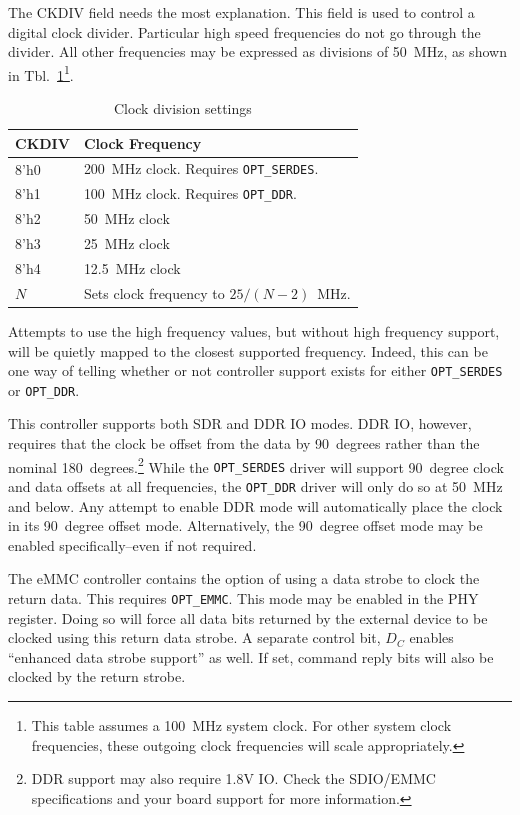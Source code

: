 \documentclass{gqtekspec}
\begin{document}
The CKDIV field needs the most explanation.  This field is used to control
a digital clock divider.  Particular high speed frequencies do not go through
the divider.  All other frequencies may be expressed as divisions of 50~MHz,
as shown in Tbl.~\ref{tbl:CKDIV}\footnote{This table assumes a 100~MHz
system clock.  For other system clock frequencies, these outgoing clock
frequencies will scale appropriately.}.
\begin{table}\begin{center}
\begin{tabular}{|p{1.2in}|p{4.0in}|}\hline
	\rowcolor[gray]{0.85} CKDIV & Clock Frequency\\\hline\hline
8'h0 & 200~MHz clock.  Requires {\tt OPT\_SERDES}.\\
8'h1 & 100~MHz clock.  Requires {\tt OPT\_DDR}.\\
8'h2 &  50~MHz clock\\
8'h3 &  25~MHz clock\\
8'h4 &  12.5~MHz clock\\
$N$ & Sets clock frequency to $25 / \left(N-2\right)$~MHz.
	\\\hline
\end{tabular}
\caption{Clock division settings}\label{tbl:CKDIV}
\end{center}\end{table}
Attempts to use the high frequency values, but without high frequency
support, will be quietly mapped to the closest supported frequency.  Indeed,
this can be one way of telling whether or not controller support exists for
either {\tt OPT\_SERDES} or {\tt OPT\_DDR}.

This controller supports both SDR and DDR IO modes.  DDR IO, however, requires
that the clock be offset from the data by 90~degrees rather than the nominal
180~degrees.\footnote{DDR support may also require 1.8V IO.  Check the SDIO/EMMC
specifications and your board support for more information.}  While the
{\tt OPT\_SERDES} driver will support 90~degree clock and data offsets at all
frequencies, the {\tt OPT\_DDR} driver will only do so at 50~MHz and below.
Any attempt to enable DDR mode will automatically place the clock in its
90~degree offset mode.  Alternatively, the 90~degree offset mode may be
enabled specifically--even if not required.

The eMMC controller contains the option of using a data strobe to clock
the return data.  This requires {\tt OPT\_EMMC}.  This mode may be enabled
in the PHY register.  Doing so will force all data bits returned by the
external device to be clocked using this return data strobe.  A separate
control bit, $D_C$ enables ``enhanced data strobe support'' as well.  If set,
command reply bits will also be clocked by the return strobe.
\end{document}
